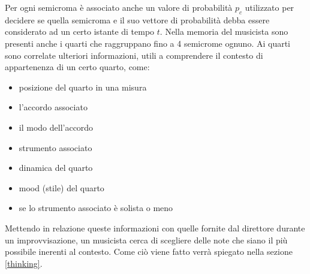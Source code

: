 Per ogni semicroma è associato anche un valore di probabilità $p_c$
utilizzato per decidere se quella semicroma e il suo vettore di
probabilità debba essere considerato ad un certo istante di tempo $t$.
Nella memoria del musicista sono presenti anche i quarti che raggruppano 
fino a 4 semicrome ognuno. Ai quarti sono correlate ulteriori informazioni, utili
a comprendere il contesto di appartenenza di un certo quarto, come:
\begin{itemize}
\item posizione del quarto in una misura
\item l'accordo associato
\item il modo dell'accordo 
\item strumento associato
\item dinamica del quarto
\item mood (stile) del quarto
\item se lo strumento associato è solista o meno
\end{itemize}
Mettendo in relazione queste informazioni con quelle fornite dal
direttore durante un improvvisazione, un musicista cerca di 
scegliere delle note che siano il più possibile inerenti al contesto.
Come ciò viene fatto verrà spiegato nella sezione \ref{thinking}.
